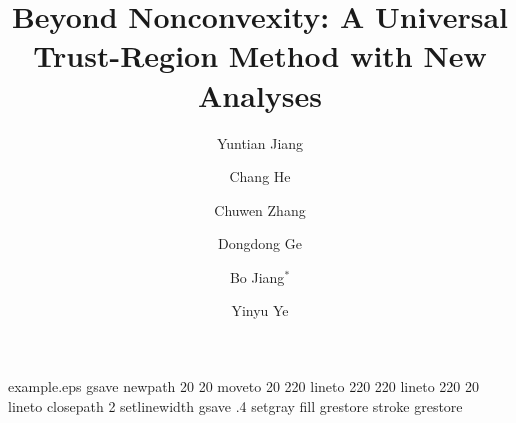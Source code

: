 %
%
%
%
%
\begin{filecontents*}{example.eps}
gsave
newpath
  20 20 moveto
  20 220 lineto
  220 220 lineto
  220 20 lineto
closepath
2 setlinewidth
gsave
  .4 setgray fill
grestore
stroke
grestore
\end{filecontents*}
%
\RequirePackage{fix-cm}
%
\documentclass[smallextended]{svjour3}       %
%
\smartqed  %
%
\usepackage{graphicx}

%
%
%
%
%


\title{Beyond Nonconvexity: A Universal Trust-Region Method with New Analyses%
}


\author{Yuntian Jiang         \and
        Chang He
\and
        Chuwen Zhang
\and 
        Dongdong Ge
\and
        Bo Jiang$^*$
\and 
        Yinyu Ye
}

